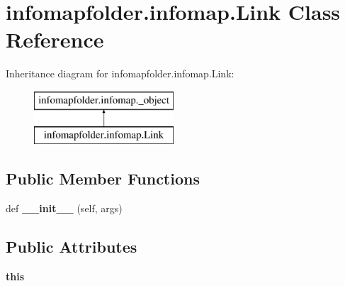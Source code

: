 \hypertarget{classinfomapfolder_1_1infomap_1_1Link}{}\section{infomapfolder.\+infomap.\+Link Class Reference}
\label{classinfomapfolder_1_1infomap_1_1Link}
Inheritance diagram for infomapfolder.\+infomap.\+Link\+:\begin{figure}[H]
\begin{center}
\leavevmode
\includegraphics[height=2.000000cm]{classinfomapfolder_1_1infomap_1_1Link}
\end{center}
\end{figure}
\subsection*{Public Member Functions}
\begin{DoxyCompactItemize}
\item 
\mbox{\label{classinfomapfolder_1_1infomap_1_1Link_aeb16a1ddc11612beb4772f880d5e1d3a}} 
def {\bfseries \+\_\+\+\_\+init\+\_\+\+\_\+} (self, args)
\end{DoxyCompactItemize}
\subsection*{Public Attributes}
\begin{DoxyCompactItemize}
\item 
\mbox{\label{classinfomapfolder_1_1infomap_1_1Link_a81ab38df5a5fa514f6dbacfc4eae5b65}} 
{\bfseries this}
\end{DoxyCompactItemize}
